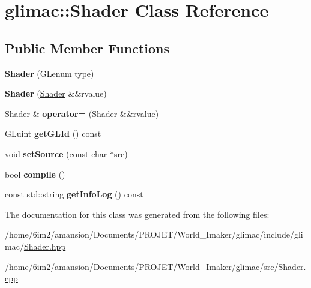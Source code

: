 \hypertarget{classglimac_1_1Shader}{}\section{glimac\+:\+:Shader Class Reference}
\label{classglimac_1_1Shader}
\subsection*{Public Member Functions}
\begin{DoxyCompactItemize}
\item 
\mbox{\label{classglimac_1_1Shader_a064a1d24851c1c405d3c912cff9521c4}} 
{\bfseries Shader} (G\+Lenum type)
\item 
\mbox{\label{classglimac_1_1Shader_a98bf794b782f89a7a5c859607e6dc62b}} 
{\bfseries Shader} (\hyperlink{classglimac_1_1Shader}{Shader} \&\&rvalue)
\item 
\mbox{\label{classglimac_1_1Shader_a0790eeb7a9fc154161bee6b78e287828}} 
\hyperlink{classglimac_1_1Shader}{Shader} \& {\bfseries operator=} (\hyperlink{classglimac_1_1Shader}{Shader} \&\&rvalue)
\item 
\mbox{\label{classglimac_1_1Shader_a46c21c4b6b9ee89426b458695897202e}} 
G\+Luint {\bfseries get\+G\+L\+Id} () const
\item 
\mbox{\label{classglimac_1_1Shader_a66701118e7f1d789a258936c82b32874}} 
void {\bfseries set\+Source} (const char $\ast$src)
\item 
\mbox{\label{classglimac_1_1Shader_a1e6c6814a6275dd698b3befdb89aa647}} 
bool {\bfseries compile} ()
\item 
\mbox{\label{classglimac_1_1Shader_aa0de6702041087187d8eca874000cfa6}} 
const std\+::string {\bfseries get\+Info\+Log} () const
\end{DoxyCompactItemize}


The documentation for this class was generated from the following files\+:\begin{DoxyCompactItemize}
\item 
/home/6im2/amansion/\+Documents/\+P\+R\+O\+J\+E\+T/\+World\+\_\+\+Imaker/glimac/include/glimac/\hyperlink{Shader_8hpp}{Shader.\+hpp}\item 
/home/6im2/amansion/\+Documents/\+P\+R\+O\+J\+E\+T/\+World\+\_\+\+Imaker/glimac/src/\hyperlink{Shader_8cpp}{Shader.\+cpp}\end{DoxyCompactItemize}
